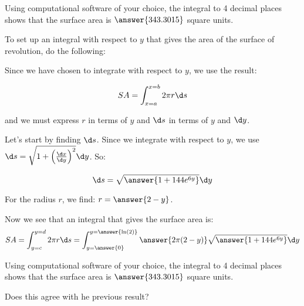 \documentclass{ximera}
\begin{document}
\begin{exercise}
\begin{exercise}
\begin{exercise}
Using computational software of your choice, the integral to 4 decimal places shows that the surface area is $\answer{343.3015}$ square units.  
\end{exercise}
\end{exercise}



To set up an integral with respect to $y$ that gives the area of the surface of revolution, do the following:  

Since we have chosen to integrate with respect to $y$, we use the result:

\[ SA = \int_{x=a}^{x=b} 2 \pi r \d s\]

and we must express $r$ in terms of $y$ and $\d s$ in terms of $y$ and $\d y$.  


Let's start by finding $\d s$.  Since we integrate with respect to $y$, we use $\d s = \sqrt{1+\left(\frac{\d x}{\d y}\right)^2} \d y$. So: 

\[
\d s = \sqrt{\answer{1+144e^{6y}}} \d y
\]


\begin{exercise}
For the radius $r$, we find: $r=\answer{2-y}$.  


\begin{exercise}
Now we see that an integral that gives the surface area is: 
\[
SA= \int_{y=c}^{y=d} 2 \pi r \d s = \int_{y=\answer{0}}^{y=\answer{\ln(2)}} \answer{ 2\pi (2-y)} \sqrt{\answer{1+144e^{6y}}} \d y
\]

\begin{exercise}
Using computational software of your choice, the integral to 4 decimal places shows that the surface area is $\answer{343.3015}$ square units.  

Does this agree with he previous result?

\begin{multipleChoice}
\end{multipleChoice}

\end{exercise}



\end{exercise}
\end{exercise}
\end{exercise}
\end{document}
